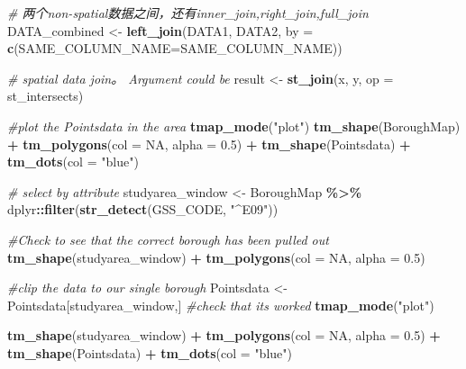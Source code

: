 \documentclass[
]{article}
\newenvironment{Shaded}{\begin{snugshade}}{\end{snugshade}}
\newcommand{\AttributeTok}[1]{\textcolor[rgb]{0.13,0.29,0.53}{#1}}
\newcommand{\CommentTok}[1]{\textcolor[rgb]{0.56,0.35,0.01}{\textit{#1}}}
\newcommand{\ConstantTok}[1]{\textcolor[rgb]{0.56,0.35,0.01}{#1}}
\newcommand{\FloatTok}[1]{\textcolor[rgb]{0.00,0.00,0.81}{#1}}
\newcommand{\FunctionTok}[1]{\textcolor[rgb]{0.13,0.29,0.53}{\textbf{#1}}}
\newcommand{\NormalTok}[1]{#1}
\newcommand{\OtherTok}[1]{\textcolor[rgb]{0.56,0.35,0.01}{#1}}
\newcommand{\SpecialCharTok}[1]{\textcolor[rgb]{0.81,0.36,0.00}{\textbf{#1}}}
\newcommand{\StringTok}[1]{\textcolor[rgb]{0.31,0.60,0.02}{#1}}
\begin{document}
\begin{Shaded}
\begin{Highlighting}[]
\CommentTok{\# 两个non{-}spatial数据之间，还有inner\_join,right\_join,full\_join}
\NormalTok{DATA\_combined }\OtherTok{\textless{}{-}} \FunctionTok{left\_join}\NormalTok{(DATA1, DATA2, }\AttributeTok{by =} \FunctionTok{c}\NormalTok{(}\StringTok{\textquotesingle{}SAME\_COLUMN\_NAME\textquotesingle{}}\OtherTok{=}\StringTok{\textquotesingle{}SAME\_COLUMN\_NAME\textquotesingle{}}\NormalTok{))}

\CommentTok{\# spatial data join。 Argument could be }
\NormalTok{result }\OtherTok{\textless{}{-}} \FunctionTok{st\_join}\NormalTok{(x, y, }\AttributeTok{op =}\NormalTok{ st\_intersects)}

\CommentTok{\#plot the Pointsdata in the area}
\FunctionTok{tmap\_mode}\NormalTok{(}\StringTok{"plot"}\NormalTok{)}
\FunctionTok{tm\_shape}\NormalTok{(BoroughMap) }\SpecialCharTok{+}
  \FunctionTok{tm\_polygons}\NormalTok{(}\AttributeTok{col =} \ConstantTok{NA}\NormalTok{, }\AttributeTok{alpha =} \FloatTok{0.5}\NormalTok{) }\SpecialCharTok{+}
\FunctionTok{tm\_shape}\NormalTok{(Pointsdata) }\SpecialCharTok{+}
  \FunctionTok{tm\_dots}\NormalTok{(}\AttributeTok{col =} \StringTok{"blue"}\NormalTok{)}
\end{Highlighting}
\end{Shaded}

\begin{Shaded}
\begin{Highlighting}[]
\CommentTok{\# select by attribute}
\NormalTok{studyarea\_window }\OtherTok{\textless{}{-}}\NormalTok{ BoroughMap }\SpecialCharTok{\%\textgreater{}\%}
\NormalTok{  dplyr}\SpecialCharTok{::}\FunctionTok{filter}\NormalTok{(}\FunctionTok{str\_detect}\NormalTok{(GSS\_CODE, }\StringTok{"\^{}E09"}\NormalTok{))}

\CommentTok{\#Check to see that the correct borough has been pulled out}
\FunctionTok{tm\_shape}\NormalTok{(studyarea\_window) }\SpecialCharTok{+}
  \FunctionTok{tm\_polygons}\NormalTok{(}\AttributeTok{col =} \ConstantTok{NA}\NormalTok{, }\AttributeTok{alpha =} \FloatTok{0.5}\NormalTok{)}

\CommentTok{\#clip the data to our single borough}
\NormalTok{Pointsdata }\OtherTok{\textless{}{-}}\NormalTok{ Pointsdata[studyarea\_window,]}
\CommentTok{\#check that it\textquotesingle{}s worked}
\FunctionTok{tmap\_mode}\NormalTok{(}\StringTok{"plot"}\NormalTok{)}

\FunctionTok{tm\_shape}\NormalTok{(studyarea\_window) }\SpecialCharTok{+}
  \FunctionTok{tm\_polygons}\NormalTok{(}\AttributeTok{col =} \ConstantTok{NA}\NormalTok{, }\AttributeTok{alpha =} \FloatTok{0.5}\NormalTok{) }\SpecialCharTok{+}
\FunctionTok{tm\_shape}\NormalTok{(Pointsdata) }\SpecialCharTok{+}
  \FunctionTok{tm\_dots}\NormalTok{(}\AttributeTok{col =} \StringTok{"blue"}\NormalTok{)}
\end{Highlighting}
\end{Shaded}
\end{document}
